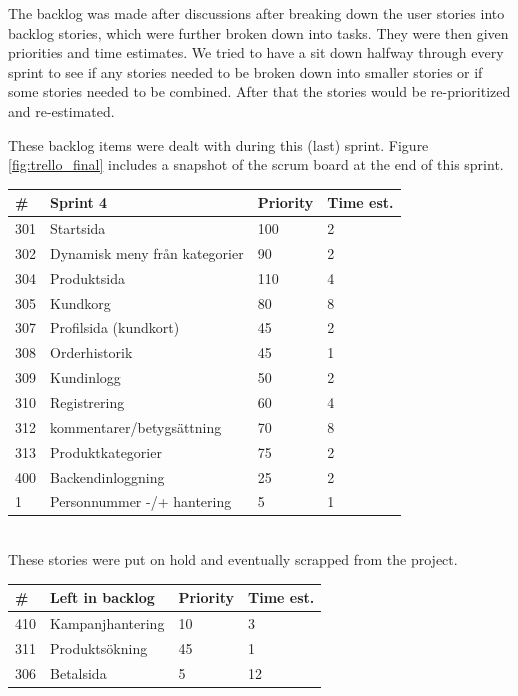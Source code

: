 \documentclass[paper=a4, fontsize=11pt]{report} %
\begin{document}
\begin{itemize}
	The backlog was made after discussions after breaking down the user stories
	into backlog stories, which were further broken down into tasks. They were
	then given priorities and time estimates. We tried to have a sit down halfway
	through every sprint to see if any stories needed to be broken down into
	smaller stories or if some stories needed to be combined. After that the
	stories would be re-prioritized and re-estimated.

	These backlog items were dealt with during this (last) sprint.
	Figure \ref{fig:trello_final} includes a snapshot of the scrum board
	at the end of this sprint. \\

	\begin{tabular}{|l|l|l|l|}
		\hline
		\#  & Sprint 4                      & Priority & Time est. \\ \hline
		301 & Startsida                     & 100      & 2         \\ \hline
		302 & Dynamisk meny från kategorier & 90       & 2         \\ \hline
		304 & Produktsida                   & 110      & 4         \\ \hline
		305 & Kundkorg                      & 80       & 8         \\ \hline
		307 & Profilsida (kundkort)         & 45       & 2         \\ \hline
		308 & Orderhistorik                 & 45       & 1         \\ \hline
		309 & Kundinlogg                    & 50       & 2         \\ \hline
		310 & Registrering                  & 60       & 4         \\ \hline
		312 & kommentarer/betygsättning     & 70       & 8         \\ \hline
		313 & Produktkategorier             & 75       & 2         \\ \hline
		400 & Backendinloggning             & 25       & 2         \\ \hline
		1   & Personnummer -/+ hantering    & 5        & 1         \\ \hline
	\end{tabular} \\


	These stories were put on hold and eventually scrapped from the project.

	\begin{tabular}{|l|l|l|l|}
		\hline
		\#  & Left in backlog  & Priority & Time est. \\ \hline
		410 & Kampanjhantering & 10       & 3         \\ \hline
		311 & Produktsökning   & 45       & 1         \\ \hline
		306 & Betalsida        & 5        & 12        \\ \hline
	\end{tabular}


\end{itemize}
\end{document}
